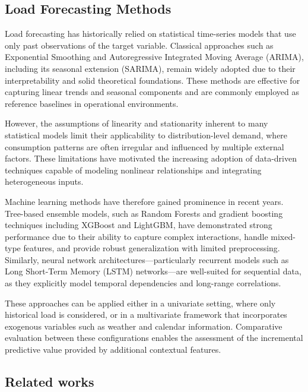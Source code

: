 \subsection{Load Forecasting Methods}

Load forecasting has historically relied on statistical time-series models that use only past observations of the target variable. Classical approaches such as Exponential Smoothing and Autoregressive Integrated Moving Average (ARIMA), including its seasonal extension (SARIMA), remain widely adopted due to their interpretability and solid theoretical foundations. These methods are effective for capturing linear trends and seasonal components and are commonly employed as reference baselines in operational environments.

However, the assumptions of linearity and stationarity inherent to many statistical models limit their applicability to distribution-level demand, where consumption patterns are often irregular and influenced by multiple external factors. These limitations have motivated the increasing adoption of data-driven techniques capable of modeling nonlinear relationships and integrating heterogeneous inputs.

Machine learning methods have therefore gained prominence in recent years. Tree-based ensemble models, such as Random Forests and gradient boosting techniques including XGBoost and LightGBM, have demonstrated strong performance due to their ability to capture complex interactions, handle mixed-type features, and provide robust generalization with limited preprocessing. Similarly, neural network architectures—particularly recurrent models such as Long Short-Term Memory (LSTM) networks—are well-suited for sequential data, as they explicitly model temporal dependencies and long-range correlations.

These approaches can be applied either in a univariate setting, where only historical load is considered, or in a multivariate framework that incorporates exogenous variables such as weather and calendar information. Comparative evaluation between these configurations enables the assessment of the incremental predictive value provided by additional contextual features.



\subsection{Related works}

